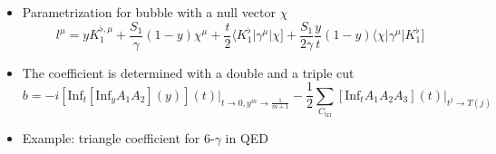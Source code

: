\documentclass[english]{beamer}
\newcommand{\Inf}{\mathrm{Inf}}
\begin{document}
\begin{frame}[shrink=10]
\begin{itemize}
\item<4-> Parametrization for bubble with a null vector $\chi$
\small
\begin{equation*}
l^\mu = yK_1^{\flat,\mu} + \frac{S_1}{\gamma}(1-y)\chi^\mu + \frac{t}{2}\langle K_1^\flat|\gamma^\mu|\chi] + \frac{S_1}{2\gamma}\frac{y}{t}(1-y)\langle \chi|\gamma^\mu|K_1^\flat]
\end{equation*}
\normalsize
\item<5->[]
The coefficient is determined with a double and a triple cut
\begin{equation*}
b = -i[\Inf_t[\Inf_y A_1 A_2](y)](t)\big|_{t\rightarrow 0 , y^m\rightarrow \frac{1}{m+1}}
-\frac{1}{2}\sum_{C_{\mathrm{tri}}}[\Inf_t A_1A_2A_3](t)\big|_{t^j\rightarrow T(j)}
\end{equation*} 

\item<6-> Example: triangle coefficient for 6-$\gamma$ in QED

\end{itemize}

\end{frame}
\end{document}
